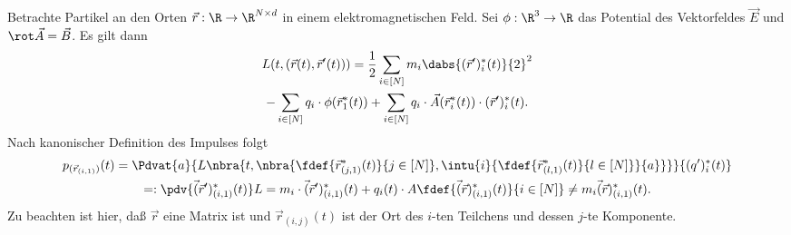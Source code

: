 \documentclass[../WiSe22ANA3.tex]{subfiles}
\begin{document}
			\begin{bsp}
				Betrachte Partikel an den Orten $\vec r:\R\to\R^{N\times d}$ in einem elektromagnetischen Feld. Sei $\phi:\R^3\to\R$ das Potential des Vektorfeldes $\vec E$ und $\rot\vec A=\vec B$. Es gilt dann 
				\begin{multline*}
					L(t,(\vec r(t),\vec r'(t)))=\frac{1}{2}\sum_{i\in[N]}m_i\dabs{(\vec r')_i^*(t)}{2}^2 \\
					-\sum_{i\in[N]}q_i\cdot\phi(\vec r_1^*(t))+\sum_{i\in[N]}q_i\cdot\vec A(\vec r_i^*(t))\cdot (\vec r')_i^*(t).
				\end{multline*}
				Nach kanonischer Definition des Impulses folgt
				\begin{multline*}
					p_{(\vec r_{(i,1)})}(t)=\Pdvat{a}{L\nbra{t,\nbra{\fdef{\vec r_{(j,1)}^*(t)}{j\in[N]},\intu{i}{\fdef{\vec r_{(l,1)}^*(t)}{l\in[N]}}{a}}}}{(q')_i^*(t)}\\
					=:\pdv{\vec (\vec r')^*_{(i,1)}(t)}L=m_i\cdot\vec (\vec r')^*_{(i,1)}(t)+q_i(t)\cdot A\fdef{\vec (\vec r)^*_{(i,1)}(t)}{i\in[N]}\neq m_i\vec (\vec r)^*_{(i,1)}(t).  
				\end{multline*}
				Zu beachten ist hier, daß $\vec r$ eine Matrix ist und $\vec r_{(i,j)}(t)$ ist der Ort des $i$-ten Teilchens und dessen $j$-te Komponente. 
			\end{bsp}
			
		
		
		
\end{document}

